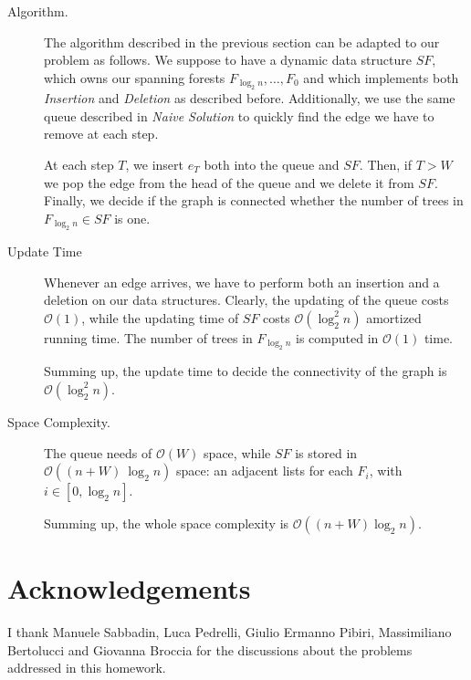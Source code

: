 \documentclass[12pt,a4paper]{article}
\begin{document}
\begin{description}
\item[Algorithm.] The algorithm described in the previous section can be adapted to our problem as follows. We suppose to have a dynamic data structure $SF$, which owns our spanning forests $F_{\log_2 n}, \dots, F_0$ and which implements both \textit{Insertion} and \textit{Deletion} as described before. Additionally, we use the same queue described in \textit{Naive Solution} to quickly find the edge we have to remove at each step.

At each step $T$, we insert $e_T$ both into the queue and $SF$. Then, if $T > W$ we pop the edge from the head of the queue and we delete it from $SF$. Finally, we decide if the graph is connected whether the number of trees in $F_{\log_2 n} \in SF$ is one.

\item[Update Time] Whenever an edge arrives, we have to perform both an insertion and a deletion on our data structures. Clearly, the updating of the queue costs $\mathcal{O}(1)$, while the updating time of $SF$ costs $\mathcal{O}(\log_2^2 n)$ amortized running time. The number of trees in $F_{\log_2 n}$ is computed in $\mathcal{O}(1)$ time.

Summing up, the update time to decide the connectivity of the graph is  $\mathcal{O}(\log_2^2 n)$.

\item[Space Complexity.] The queue needs of $\mathcal{O}(W)$ space, while $SF$ is stored in $\mathcal{O}((n + W)\ \log_2 n)$ space: an adjacent lists for each $F_i$, with $i \in [0, \log_2 n]$.

Summing up, the whole space complexity is $\mathcal{O}((n + W) \log_2 n)$.
\end{description}





\section*{Acknowledgements}
I thank Manuele Sabbadin, Luca Pedrelli, Giulio Ermanno Pibiri, Massimiliano Bertolucci and Giovanna Broccia for the discussions about the problems addressed in this homework.
\end{document}
